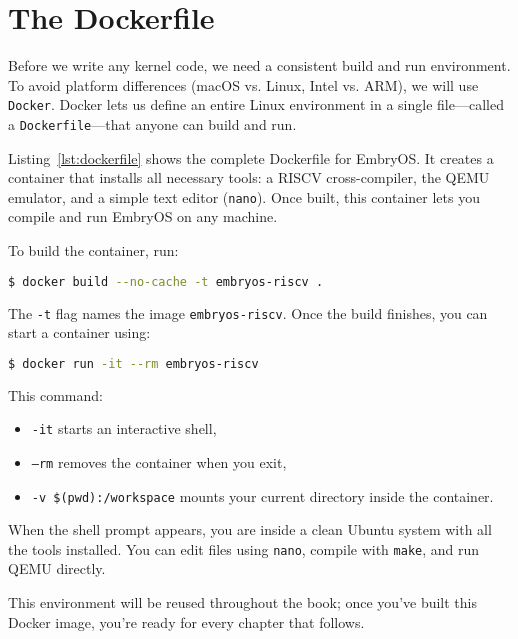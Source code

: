 \section{The Dockerfile}

Before we write any kernel code, we need a consistent build and run environment.
To avoid platform differences (macOS vs. Linux, Intel vs. ARM), we will use
\texttt{Docker}.  Docker lets us define an entire Linux environment in a single
file—called a \texttt{Dockerfile}—that anyone can build and run.

Listing~\ref{lst:dockerfile} shows the complete Dockerfile for EmbryOS.  It
creates a container that installs all necessary tools: a RISC\textendash V
cross-compiler, the QEMU emulator, and a simple text editor (\texttt{nano}).
Once built, this container lets you compile and run EmbryOS on any machine.

\begin{figure}[H]
\centering
\begin{minipage}{0.95\textwidth}

\end{minipage}
\end{figure}

To build the container, run:

\begin{lstlisting}[style=oscode,language=bash]
$ docker build --no-cache -t embryos-riscv .
\end{lstlisting}

The \texttt{-t} flag names the image \texttt{embryos-riscv}.  
Once the build finishes, you can start a container using:

\begin{lstlisting}[style=oscode,language=bash]
$ docker run -it --rm embryos-riscv
\end{lstlisting}

This command:
\begin{itemize}
  \item \texttt{-it} starts an interactive shell,
  \item \texttt{--rm} removes the container when you exit,
  \item \texttt{-v \$(pwd):/workspace} mounts your current directory inside the container.
\end{itemize}

When the shell prompt appears, you are inside a clean Ubuntu system with all the
tools installed.  You can edit files using \texttt{nano}, compile with
\texttt{make}, and run QEMU directly.

\bigskip
\noindent
This environment will be reused throughout the book; once you’ve built this
Docker image, you’re ready for every chapter that follows.
